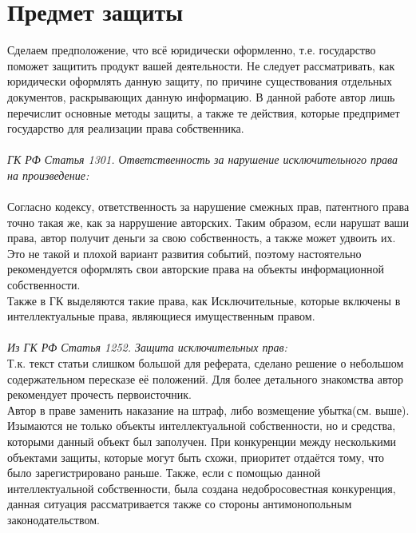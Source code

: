 \section{Предмет защиты}
Сделаем предположение,
	что всё юридически оформленно,
		т.е. государство поможет защитить продукт вашей деятельности.
Не следует рассматривать,
	как юридически оформлять данную защиту,
		по причине существования отдельных документов,
			раскрывающих данную информацию.
В данной работе автор лишь перечислит основные методы защиты,
	а также те действия,
		которые предпримет государство для реализации права собственника.
\\
\\
\textit{ГК РФ Статья 1301. Ответственность за нарушение исключительного права на произведение:}\\


\\

Согласно кодексу, ответственность за нарушение смежных прав, патентного права точно такая же,
	как за наррушение авторских.
Таким образом, если нарушат ваши права,
	автор получит деньги за свою собственность,
	а также может удвоить их.
Это не такой и плохой вариант развития событий,
	поэтому настоятельно рекомендуется оформлять свои авторские права на объекты информационной собственности.
\\

Также в ГК выделяются такие права, как Исключительные,
	которые включены в интеллектуальные права,
	являющиеся имущественным правом.
\\
\\
\textit{Из ГК РФ Статья 1252. Защита исключительных прав:}\\

Т.к. текст статьи слишком большой для реферата,
	сделано решение о небольшом содержательном пересказе её положений.
Для более детального знакомства автор рекомендует прочесть первоисточник.
\\

Автор в праве заменить наказание на штраф, либо возмещение убытка(см. выше).
Изымаются не только объекты интеллектуальной собственности, но и средства,
	которыми данный объект был заполучен.
При конкуренции между несколькими объектами защиты,
	которые могут быть схожи,
	приоритет отдаётся тому,
		что было зарегистрировано раньше.
Также, если с помощью данной интеллектуальной собственности,
	была создана недобросовестная конкуренция,
		данная ситуация рассматривается также со стороны антимонопольным законодательством.
